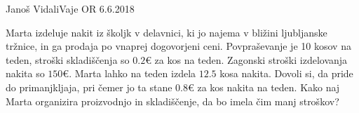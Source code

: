 \begin{naloga}{Janoš Vidali}{Vaje OR 6.6.2018}
\begin{vprasanje}
Marta izdeluje nakit iz školjk v delavnici,
ki jo najema v bližini ljubljanske tržnice,
in ga prodaja po vnaprej dogovorjeni ceni.
Povpraševanje je 10 kosov na teden,
stroški skladiščenja so $0.2 €$ za kos na teden.
Zagonski stroški izdelovanja nakita so $150 €$.
Marta lahko na teden izdela $12.5$ kosa nakita.
Dovoli si, da pride do primanjkljaja,
pri čemer jo ta stane $0.8 €$ za kos nakita na teden.
Kako naj Marta organizira proizvodnjo in skladiščenje,
da bo imela čim manj stroškov?
\end{vprasanje}
\begin{odgovor}
\end{odgovor}
\end{naloga}
